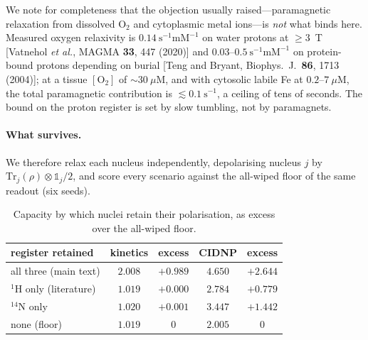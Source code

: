 \documentclass[aps,prx,reprint,superscriptaddress,nofootinbib,floatfix]{revtex4-2}
\begin{document}
We note for completeness that the objection usually raised---paramagnetic
relaxation from dissolved O$_2$ and cytoplasmic metal ions---is \emph{not} what
binds here. Measured oxygen relaxivity is $0.14~\mathrm{s^{-1}mM^{-1}}$ on water
protons at $\ge3$~T [Vatnehol \textit{et al.}, MAGMA \textbf{33}, 447 (2020)] and
$0.03$--$0.5~\mathrm{s^{-1}mM^{-1}}$ on protein-bound protons depending on burial
[Teng and Bryant, Biophys.~J.\ \textbf{86}, 1713 (2004)]; at a tissue
$[\mathrm{O_2}]$ of $\sim30~\mu$M, and with cytosolic labile Fe at $0.2$--$7~\mu$M,
the total paramagnetic contribution is $\lesssim0.1~\mathrm{s^{-1}}$, a ceiling of
tens of seconds. The bound on the proton register is set by slow tumbling, not by
paramagnets.

\paragraph*{What survives.} We therefore relax each nucleus independently,
depolarising nucleus $j$ by $\mathrm{Tr}_j(\rho)\otimes\mathbb{1}_j/2$, and score
every scenario against the all-wiped floor of the same readout (six seeds).

\begin{table}[H]
\caption{\label{tab:nuclide}Capacity by which nuclei retain their polarisation,
as excess over the all-wiped floor.}
\begin{ruledtabular}
\begin{tabular}{lcccc}
register retained & kinetics & excess & CIDNP & excess \\
\hline
all three (main text) & $2.008$ & $+0.989$ & $4.650$ & $+2.644$ \\
$^1$H only (literature) & $1.019$ & $+0.000$ & $2.784$ & $\mathbf{+0.779}$ \\
$^{14}$N only & $1.020$ & $+0.001$ & $3.447$ & $+1.442$ \\
none (floor) & $1.019$ & $0$ & $2.005$ & $0$ \\
\end{tabular}
\end{ruledtabular}
\end{table}
\end{document}
